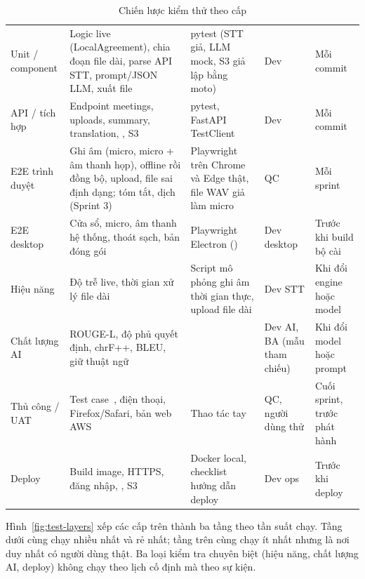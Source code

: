 \documentclass[12pt,a4paper]{report}
\begin{document}
\begin{table}[htbp]
  \centering
  \caption{Chiến lược kiểm thử theo cấp}
  \label{tab:strategy}
  \small
  \setlength{\tabcolsep}{4pt}
  \begin{tabularx}{\linewidth}{@{}P{2.3cm}LP{3.5cm}P{1.9cm}P{2.2cm}@{}}
    \toprule
     &  &  &  &  \\
    \midrule
    Unit / component & Logic live (LocalAgreement), chia đoạn file dài, parse API STT, prompt/JSON LLM, xuất file
      & pytest (STT giả, LLM mock, S3 giả lập bằng moto) & Dev & Mỗi commit \\
    API / tích hợp & Endpoint meetings, uploads, summary, translation, , S3 & pytest, FastAPI TestClient
      & Dev & Mỗi commit \\
    E2E trình duyệt & Ghi âm (micro, micro + âm thanh họp), offline rồi đồng bộ, upload, file sai định dạng; tóm
      tắt, dịch (Sprint 3) & Playwright trên Chrome và Edge thật, file WAV giả làm micro & QC & Mỗi sprint \\
    E2E desktop & Cửa sổ, micro, âm thanh hệ thống, thoát sạch, bản đóng gói
      & Playwright Electron () & Dev desktop & Trước khi build bộ cài \\
    Hiệu năng & Độ trễ live, thời gian xử lý file dài & Script mô phỏng ghi âm thời gian thực, upload file dài
      & Dev STT & Khi đổi engine hoặc model \\
    Chất lượng AI & ROUGE-L, độ phủ quyết định, chrF++, BLEU, giữ thuật ngữ & 
      & Dev AI, BA (mẫu tham chiếu) & Khi đổi model hoặc prompt \\
    Thủ công / UAT & Test case~\cite{testcases}, điện thoại, Firefox/Safari, bản web AWS & Thao tác tay
      & QC, người dùng thử & Cuối sprint, trước phát hành \\
    Deploy & Build image, HTTPS, đăng nhập, , S3 & Docker local, checklist hướng dẫn deploy
      & Dev ops & Trước khi deploy \\
    \bottomrule
  \end{tabularx}
\end{table}

Hình~\ref{fig:test-layers} xếp các cấp trên thành ba tầng theo tần suất chạy. Tầng dưới cùng chạy nhiều nhất và
rẻ nhất; tầng trên cùng chạy ít nhất nhưng là nơi duy nhất có người dùng thật. Ba loại kiểm tra chuyên biệt
(hiệu năng, chất lượng AI, deploy) không chạy theo lịch cố định mà theo sự kiện.
\end{document}
